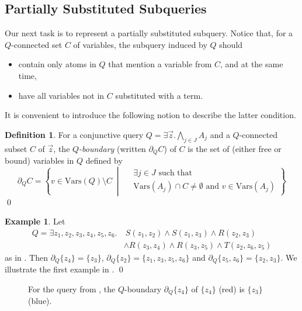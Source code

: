 \documentclass[12pt]{report}
\theoremstyle{plain}
\theoremstyle{definition}
\newtheorem{definition}[theorem]{Definition}
\newtheorem{example}[theorem]{Example}
\def\Vars{{\mathrm{Vars}}}
\begin{document}
\subsection{Partially Substituted Subqueries}
\label{subsection:partially-substituted-subqueries}

Our next task is to represent a partially substituted subquery. Notice that, for a $Q$-connected set $C$ of variables, the subquery induced by $Q$ should
\begin{itemize}
  \item contain only atoms in $Q$ that mention a variable from $C$, and at the same time,
  \item have all variables not in $C$ substituted with a term.
\end{itemize}
It is convenient to introduce the following notion to describe the latter condition.

\begin{definition}
  For a conjunctive query $Q = \exists \vec{z}. \bigwedge_{j \in J} A_j$ and a $Q$-connected subset $C$ of $\vec{z}$, the \emph{$Q$-boundary} (written $\partial_Q C$) of $C$ is the set of (either free or bound) variables in $Q$ defined by $$
    \partial_Q C = \left\{
      v \in \Vars(Q) \setminus C
        \;\middle|\;
      \begin{aligned}
        & \exists j \in J \text{ such that } \\
        & \Vars(A_j) \cap C \neq \emptyset \text{ and } v \in \Vars(A_j)
      \end{aligned}
    \right\}
  $$
  \qed
\end{definition}

\begin{example}
  Let
  \begin{align*}
    Q = \exists z_1,z_2,z_3,z_4,z_5,z_6.&\ S(z_1, z_2) \wedge S(z_1,z_3) \wedge R(z_2, z_3) \\
    &\wedge R(z_3, z_4) \wedge R(z_3, z_5) \wedge T(z_2, z_6, z_5)
  \end{align*}
  as in . Then $\partial_Q \{z_4\} = \{z_3\}$, $\partial_Q \{z_2\} = \{z_1, z_3, z_5, z_6\}$ and $\partial_Q \{z_5, z_6\} = \{z_2, z_3\}$. We illustrate the first example in .
  \qed
\end{example}

\begin{figure}[h]
  \centering
  
  \caption{For the query from , the $Q$-boundary $\partial_Q \{z_4\}$ of $\{z_4\}$ (red) is $\{z_3\}$ (blue).}
  \label{query-boundary-example}
\end{figure}
\end{document}

